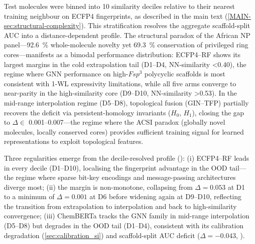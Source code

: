 \documentclass[11pt,a4paper]{article}
\begin{document}
Test molecules were binned into \num{10} similarity deciles relative to their nearest training neighbour on ECFP4 fingerprints, as described in the main text (\cref{MAIN-sec:structural-complexity}). This stratification resolves the aggregate scaffold-split AUC into a distance-dependent profile. The structural paradox of the African NP panel---\qty{92.6}{\percent} whole-molecule novelty yet \qty{69.3}{\percent} conservation of privileged ring cores---manifests as a bimodal performance distribution: ECFP4--RF shows its largest margins in the cold extrapolation tail (D1--D4, NN-similarity \num{<0.40}), the regime where GNN performance on high-$Fsp^3$ polycyclic scaffolds is most consistent with 1-WL expressivity limitations, while all five arms converge to near-parity in the high-similarity core (D9--D10, NN-similarity \num{>0.53}). In the mid-range interpolation regime (D5--D8), topological fusion (GIN--TFP) partially recovers the deficit via persistent-homology invariants ($H_0$, $H_1$), closing the gap to $\Delta \in$ \numrange{0.001}{0.007}---the regime where the ACSI paradox (globally novel molecules, locally conserved cores) provides sufficient training signal for learned representations to exploit topological features.

Three regularities emerge from the decile-resolved profile (): (i) ECFP4--RF leads in every decile (D1--D10), localising the fingerprint advantage in the OOD tail---the regime where sparse bit-key encodings and message-passing architectures diverge most; (ii) the margin is non-monotone, collapsing from $\Delta = \num{0.053}$ at D1 to a minimum of $\Delta = \num{0.001}$ at D6 before widening again at D9--D10, reflecting the transition from extrapolation to interpolation and back to high-similarity convergence; (iii) ChemBERTa tracks the GNN family in mid-range interpolation (D5--D8) but degrades in the OOD tail (D1--D4), consistent with its calibration degradation (\cref{sec:calibration_si}) and scaffold-split AUC deficit ($\Delta = \num{-0.043}$, ).
\end{document}
